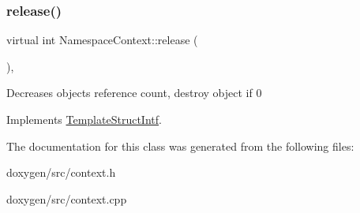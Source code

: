 \mbox{\label{class_namespace_context_ab7009613a99e733dd82347c46963808c}} 
\subsubsection{\texorpdfstring{release()}{release()}}
{\footnotesize\ttfamily virtual int Namespace\+Context\+::release (\begin{DoxyParamCaption}{ }\end{DoxyParamCaption})\hspace{0.3cm}{\ttfamily [inline]}, {\ttfamily [virtual]}}

Decreases object\textquotesingle{}s reference count, destroy object if 0 

Implements \mbox{\hyperlink{class_template_struct_intf_a3dce7dd29d3f66a8080b40578e8a5045}{Template\+Struct\+Intf}}.



The documentation for this class was generated from the following files\+:\begin{DoxyCompactItemize}
\item 
doxygen/src/context.\+h\item 
doxygen/src/context.\+cpp\end{DoxyCompactItemize}
